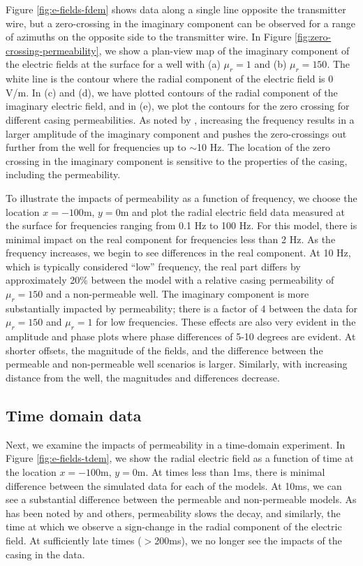 \documentclass[onecolumn, extra, mreferee]{gji}
\begin{document}


Figure \ref{fig:e-fields-fdem} shows data along a single line opposite the transmitter wire, but a zero-crossing in the imaginary component can be observed for a range of azimuths on the opposite side to the transmitter wire. In Figure \ref{fig:zero-crossing-permeability}, we show a plan-view map of the imaginary component of the electric fields at the surface for a well with (a) $\mu_r=1$ and (b) $\mu_r=150$. The white line is the contour where the radial component of the electric field is 0 V/m. In (c) and (d), we have plotted contours of the radial component of the imaginary electric field, and in (e), we plot the contours for the zero crossing for different casing permeabilities. As noted by \cite{wilt_casing_2020}, increasing the frequency results in a larger amplitude of the imaginary component and pushes the zero-crossings out further from the well for frequencies up to $\sim$10 Hz. The location of the zero crossing in the imaginary component is sensitive to the properties of the casing, including the permeability.




To illustrate the impacts of permeability as a function of frequency, we choose the location $x=-100$m, $y=0$m and plot the radial electric field data measured at the surface for frequencies ranging from 0.1 Hz to 100 Hz. For this model, there is minimal impact on the real component for frequencies less than 2 Hz. As the frequency increases, we begin to see differences in the real component. At 10 Hz, which is typically considered ``low'' frequency, the real part differs by approximately 20\% between the model with a relative casing permeability of $\mu_r=150$ and a non-permeable well. The imaginary component is more substantially impacted by permeability; there is a factor of 4 between the data for $\mu_r=150$ and $\mu_r=1$ for low frequencies. These effects are also very evident in the amplitude and phase plots where phase differences of 5-10 degrees are evident. At shorter offsets, the magnitude of the fields, and the difference between the permeable and non-permeable well scenarios is larger. Similarly, with increasing distance from the well, the magnitudes and differences decrease.



\subsection{Time domain data}
Next, we examine the impacts of permeability in a time-domain experiment. In Figure \ref{fig:e-fields-tdem}, we show the radial electric field as a function of time at the location $x=-100$m, $y=0$m.  At times less than 1ms, there is minimal difference between the simulated data for each of the models. At 10ms, we can see a substantial difference between the permeable and non-permeable models. As has been noted by \citep{Pavlov2001} and others, permeability slows the decay, and similarly, the time at which we observe a sign-change in the radial component of the electric field. At sufficiently late times ($>$200ms), we no longer see the impacts of the casing in the data.
\end{document}
